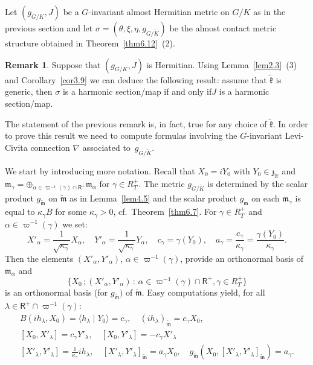 \documentclass[a4paper,reqno]{amsart}
\theoremstyle{definition}
\newtheorem{rem}[thm]{Remark}
\theoremstyle{remark}
\theoremstyle{plain}
\numberwithin{equation}{section}
\newcommand{\R}{{\mathbb{R}}}
\newcommand{\fm}{{\mathfrak{m}}}
\newcommand{\fz}{{\mathfrak{z}}}
\def\boplus{\mathbin{\boldsymbol{\oplus}}}
\newcommand{\ascal}[2]{{\langle {#1}  \mid {#2} \rangle}}
\newcommand{\vpi}{\varpi}
\newcommand{\proots}{\mathsf{R}^+}
\newcommand{\wK}{{\widetilde{K}}}
\newcommand{\wk}{{\widetilde{\mathfrak{k}}}}
\newcommand{\wm}{{\widetilde{\mathfrak{m}}}}
\newcommand{\sissi}{if and only if\xspace}
\newcommand{\ACMS}{almost contact metric
  structure\xspace}
\newcommand{\txeMK}{{(\theta,\xi,\eta,g_{\scriptscriptstyle{G/\wK}})}}
\begin{document}

Let $(g_{\scriptscriptstyle{G/K}},J)$ be a $G$-invariant almost Hermitian metric on
$G/K$ as in the previous section and let $\sigma= \txeMK$ be the
\ACMS obtained in Theorem~\ref{thm6.12}~(2).



\begin{rem}
  \label{rem4.6}
  Suppose that $(g_{\scriptscriptstyle{G/K}},J)$ is Hermitian.  Using
  Lemma~\ref{lem2.3}~(3) and Corollary~\ref{cor3.9} we can deduce
  the following result: assume that $\wk$ is generic, then
  $\sigma$ is a harmonic section/map \sissi $J$ is a harmonic
  section/map.
\end{rem}


The statement of the previous remark  is, in fact,   %
true for any choice of $\wk$. In order to
prove  this  result we need to compute formulas involving  the
$G$-invariant Levi-Civita connection  $\nabla$ associated
to~$g_{\scriptscriptstyle{G/\wK}}$. 

We start by introducing more notation. Recall that $X_0=iY_0$
with $Y_0 \in \fz_\R$ and
$\fm_\gamma = \boplus_{\alpha \in \varpi^{-1}(\gamma) \cap
  \proots} \fm_\alpha$ for $\gamma \in R_T^+$. The
metric $g_{\scriptscriptstyle{G/\wK}}$ is determined by the scalar product
$g_\wm$ on $\wm$ as in Lemma~\ref{lem4.5} and the scalar product
$g_\fm$ on each $\fm_\gamma$ is equal to $\kappa_\gamma B$ for
some $\kappa_\gamma >0$, cf.~Theorem~\ref{thm6.7}.
For $\gamma \in R_T^+$ and  $\alpha \in
\vpi^{-1}(\gamma)$ we set:
\begin{equation*}
  \label{eq6.14}
  X'_\alpha = \frac{1}{\sqrt{\kappa_\gamma}} X_\alpha, \quad
  Y'_\alpha = \frac{1}{\sqrt{\kappa_\gamma}} Y_\alpha, \quad
  c_\gamma= \gamma(Y_0), \quad a_\gamma=
  \frac{c_\gamma}{\kappa_\gamma} = \frac{\gamma(Y_0)}{\kappa_\gamma}.
\end{equation*}
Then the elements $(X'_\alpha,  Y'_\alpha)$, $\alpha \in
\varpi^{-1}(\gamma)$, provide an orthonormal basis 
of $\fm_\alpha$ and
\[
\bigl\{X_0 \, ;  (X'_\alpha,  Y'_\alpha) \, : \, \alpha \in
\varpi^{-1}(\gamma) \cap \proots, \gamma \in R_T^+ \bigr\}
\]
is an orthonormal basis (for $g_\wm)$ of $\wm$. Easy computations yield, {for all
    $\lambda \in \proots \cap \vpi^{-1}(\gamma)$}:
\begin{gather*}
  B(ih_\lambda,X_0) = \ascal{h_\lambda}{Y_0} = c_\gamma, \quad
  (i h_\lambda)_\wm =  c_\gamma X_0,
  \\
  [X_0,X'_\lambda] = c_\gamma  Y'_\lambda, \quad  [X_0,Y'_\lambda]
  = - c_\gamma X'_\lambda
  \\
  [X'_\lambda,Y'_\lambda] = \frac{1}{\kappa_\gamma} i h_\lambda, \quad
  [X'_\lambda,Y'_\lambda]_\wm = a_\gamma X_0, \quad
    g_\wm(X_0, [X'_\lambda,Y'_\lambda]_\wm) = a_\gamma. 
\end{gather*}
\end{document}
